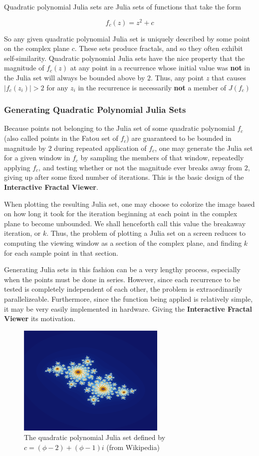 \documentclass{article}
\begin{document}
Quadratic polynomial Julia sets are Julia sets of functions that take the form

$$
f_c(z) = z^2 + c
$$

So any given quadratic polynomial Julia set is uniquely described by some point on the complex plane $c$. These sets produce fractals, and so they often exhibit self-similarity. Quadratic polynomial Julia sets have the nice property that the magnitude of $f_c(z)$ at any point in a recurrence whose initial value was \textbf{not} in the Julia set will always be bounded above by $2$. Thus, any point $z$ that causes $|f_c(z_i)| > 2$ for any $z_i$ in the recurrence is necessarily \textbf{not} a member of $J(f_c)$

\subsubsection{Generating Quadratic Polynomial Julia Sets}

Because points not belonging to the Julia set of some quadratic polynomial $f_c$ (also called points in the Fatou set of $f_c$) are guaranteed to be bounded in magnitude by $2$ during repeated application of $f_c$, one may generate the Julia set for a given window in $f_c$ by sampling the members of that window, repeatedly applying $f_c$, and testing whether or not the magnitude ever breaks away from $2$, giving up after some fixed number of iterations. This is the basic design of the \textbf{Interactive Fractal Viewer}. 

When plotting the resulting Julia set, one may choose to colorize the image based on how long it took for the iteration beginning at each point in the complex plane to become unbounded. We shall henceforth call this value the breakaway iteration, or $k$. Thus, the problem of plotting a Julia set on a screen reduces to computing the viewing window as a section of the complex plane, and finding $k$ for each sample point in that section.

Generating Julia sets in this fashion can be a very lengthy process, especially when the points must be done in series. However, since each recurrence to be tested is completely independent of each other, the problem is extraordinarily parallelizeable. Furthermore, since the function being applied is relatively simple, it may be very easily implemented in hardware. Giving the \textbf{Interactive Fractal Viewer} its motivation.

\begin{figure}
  \centering
	\includegraphics[width=200pt]{images/julia_wiki.png}
  \caption{The quadratic polynomial Julia set defined by $c=(\phi - 2)+(\phi - 1)i$ (from Wikipedia)}
\end{figure}
\end{document}

